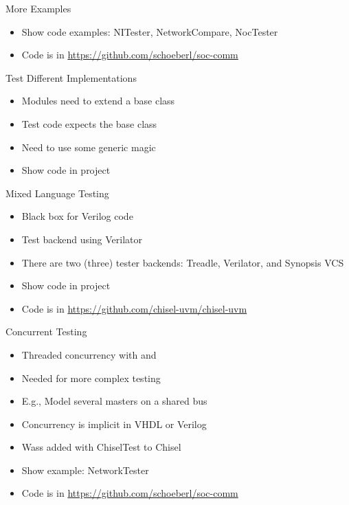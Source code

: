 \begin{frame}[fragile]{More Examples}
\begin{itemize}
\item Show code examples: NITester, NetworkCompare, NocTester
\item Code is in \url{https://github.com/schoeberl/soc-comm}
\end{itemize}
\end{frame}

\begin{frame}[fragile]{Test Different Implementations}
\begin{itemize}
\item Modules need to extend a base class
\item Test code expects the base class
\item Need to use some generic magic
\item Show code in  project
\end{itemize}
\end{frame}

\begin{frame}[fragile]{Mixed Language Testing}
\begin{itemize}
\item Black box for Verilog code
\item Test backend using Verilator
\item There are two (three) tester backends: Treadle, Verilator, and Synopsis VCS
\item Show code in  project
\item Code is in \url{https://github.com/chisel-uvm/chisel-uvm}
\end{itemize}
\end{frame}

\begin{frame}[fragile]{Concurrent Testing}
\begin{itemize}
\item Threaded concurrency with  and 
\item Needed for more complex testing
\item E.g., Model several masters on a shared bus
\item Concurrency is implicit in VHDL or Verilog
\item Wass added with ChiselTest to Chisel
\item Show example: NetworkTester
\item Code is in \url{https://github.com/schoeberl/soc-comm}
\end{itemize}
\end{frame}



